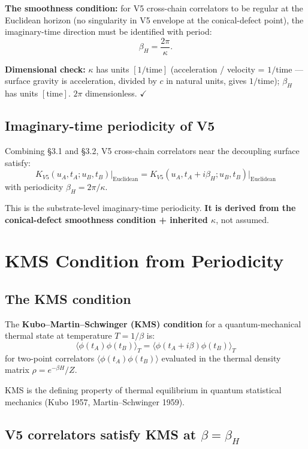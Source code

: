 \documentclass[11pt,a4paper]{article}
\begin{document}
\textbf{The smoothness condition:} for V5 cross-chain correlators to be regular at the Euclidean horizon (no singularity in V5 envelope at the conical-defect point), the imaginary-time direction must be identified with period:
\[
\beta_H = \frac{2\pi}{\kappa}.
\]

\textbf{Dimensional check:} $\kappa$ has units $[1/\mathrm{time}]$ (acceleration / velocity = $1/\mathrm{time}$ --- surface gravity is acceleration, divided by $c$ in natural units, gives $1/\mathrm{time}$); $\beta_H$ has units $[\mathrm{time}]$. $2\pi$ dimensionless. $\checkmark$

\subsection{Imaginary-time periodicity of V5}

Combining \S3.1 and \S3.2, V5 cross-chain correlators near the decoupling surface satisfy:
\[
K_{V5}(u_A, t_A; u_B, t_B)\Big|_\mathrm{Euclidean} = K_{V5}(u_A, t_A + i\beta_H; u_B, t_B)\Big|_\mathrm{Euclidean}
\]
with periodicity $\beta_H = 2\pi/\kappa$.

This is the substrate-level imaginary-time periodicity. \textbf{It is derived from the conical-defect smoothness condition + inherited $\kappa$}, not assumed.

\section{KMS Condition from Periodicity}

\subsection{The KMS condition}

The \textbf{Kubo--Martin--Schwinger (KMS) condition} for a quantum-mechanical thermal state at temperature $T = 1/\beta$ is:
\[
\langle\phi(t_A)\phi(t_B)\rangle_T = \langle\phi(t_A + i\beta)\phi(t_B)\rangle_T
\]
for two-point correlators $\langle\phi(t_A)\phi(t_B)\rangle$ evaluated in the thermal density matrix $\rho = e^{-\beta H}/Z$.

KMS is the defining property of thermal equilibrium in quantum statistical mechanics (Kubo 1957, Martin--Schwinger 1959).

\subsection{V5 correlators satisfy KMS at $\beta = \beta_H$}
\end{document}
